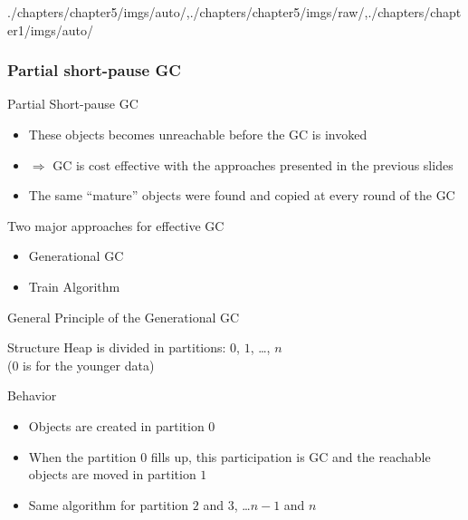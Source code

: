 \begin{graphicspathcontext}{{./chapters/chapter5/imgs/auto/},{./chapters/chapter5/imgs/raw/},{./chapters/chapter1/imgs/auto/}}
\begin{bibunit}[apalike]
\subsubsection{Partial short-pause GC}
\subsubsectiontableofcontentslide

\begin{frame}{Partial Short-pause GC}
	\vspace{.25cm}
	\begin{itemize}
		\item These objects becomes unreachable before the GC is invoked
		\item $\Rightarrow$ GC is cost effective with the approaches presented in the previous slides
	\end{itemize}
	\vspace{.25cm}
	\begin{itemize}
		\item The same ``mature'' objects were found and copied at every round of the GC
	\end{itemize}
	\vspace{.25cm}
	\begin{block}{Two major approaches for effective GC}
		\begin{itemize}
			\item Generational GC
			\item Train Algorithm
		\end{itemize}
	\end{block}
\end{frame}

\begin{frame}{{General Principle} of the Generational GC}
	\begin{block}{Structure}
		Heap is divided in partitions: $0$, $1$, \dots, $n$ \\
		($0$ is for the younger data)
	\end{block}
	\vspace{.5cm}
	\begin{block}{Behavior}
		\begin{itemize}
			\item Objects are created in partition $0$
			\item When the partition $0$ fills up, this participation is GC and the reachable objects are moved in partition $1$
			\item Same algorithm for partition $2$ and $3$, \dots $n-1$ and $n$
		\end{itemize}
	\end{block}
\end{frame}


\end{bibunit}
\end{graphicspathcontext}
